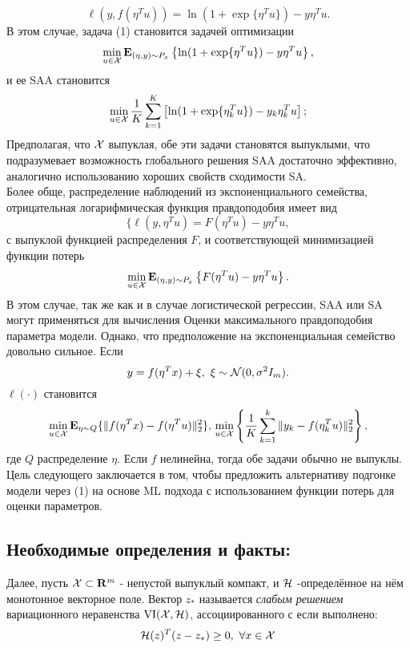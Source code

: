 \documentclass[11pt]{article}
\def\cX{{\cal X}}
\def\bR{{\mathbf{R}}}
\def\cH{{\cal H}}
\def\cX{{\cal X}}
\def\cN{{\cal N}}
\def\bE{{\mathbf{E}}}
\def\VI{{\textrm{VI}}}
\begin{document}
$$
\ell(y,f(\eta^T u))=\ln(1+\exp\{\eta^T u\})-y\eta^T u.
$$
В этом случае, задача (1) становится задачей оптимизации
\begin{equation}\label{ait1}
\min_{u\in \cX} \bE_{(\eta,y)\sim P_x}\left\{\ln(1+\exp\{\eta^T u\})-y\eta^T u\right\},
\end{equation}
и ее SAA становится
\begin{equation}\label{ait3}
\min_{u\in \cX} {1\over K}\sum_{k=1}^K\left[\ln(1+\exp\{\eta_k^T u\})-y_k\eta_k^T u\right];
\end{equation}
Предполагая, что $\cX$ выпуклая, обе эти задачи становятся выпуклыми, что подразумевает возможность глобального решения SAA достаточно эффективно, аналогично использованию хороших свойств сходимости SA.\\
Более обще, распределение наблюдений из экспоненциального семейства, отрицательная логарифмическая функция правдоподобия имеет вид
\[
\{\ell(y,\eta^T u)=F(\eta^T u)-y\eta^T u,
\]
с выпуклой функцией распределения $F$, и соответствующей минимизацией функции потерь
$$
\min_{u\in \cX} \bE_{(\eta,y)\sim P_x}
\left\{F(\eta^Tu)-y\eta^Tu\right\}.
$$
В этом случае, так же как и в случае логистической регрессии, SAA или SA могут применяться для вычисления
Оценки максимального правдоподобия параметра модели.
Однако, что предположение на экспоненциальная семейство довольно сильное. Если 
$$
y=f(\eta^Tx)+\xi,\,\,\xi\sim\cN(0,\sigma^2I_m).
$$
 $\ell(\cdot)$ становится
$$
\min_{u\in \cX}\bE_{\eta\sim Q}\{\|f(\eta^T x)-f(\eta^T u)\|_2^2\},\newline
\min_{u\in \cX}\left\{{1\over K}\sum_{k=1}^k\|y_k-f(\eta_k^T u)\|_2^2\right\},
$$
где $Q$ распределение $\eta$. Если $f$ нелинейна, тогда обе задачи обычно не выпуклы. 
Цель следующего заключается в том, чтобы предложить альтернативу подгонке модели через (1) на основе ML
 подхода с использованием функции потерь для оценки параметров.

\subsection{Необходимые определения и факты:}



Далее, пусть $\cX{} \subset \bR^m$ - непустой выпуклый компакт, и $\cH$ -определённое на нём монотонное векторное поле. Вектор $z_*$ называется \emph{слабым решением} вариационного неравенства $\VI(\cX{}, \cH)$, ассоциированного с  если выполнено: 
\begin{equation}
    \label{v_i_weak}
    \cH(z)^T(z - z_*) \ge 0, ~ \forall{x \in \cX{}} 
\end{equation}
\end{document}
